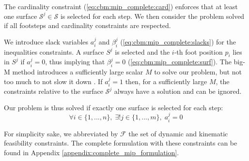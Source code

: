 The cardinality constraint (\ref{eq:cbm:mip_complete:card}) enforces that at least one surface $\mathcal{S}^j \in \mathcal{S}$ is selected for each step.
We then consider the problem solved if all footsteps and cardinality constraints are respected. 

We introduce slack variables $a_i^j$ and $\beta_i^j$ (\ref{eq:cbm:mip_complete:slacks}) for the inequalities constraints. %
A surface $S^j$ is selected and the $i$-th foot position $p_i$ lies in  $S^j$ if $a_i^j = 0$, thus implying that $\beta_i^j = 0$ (\ref{eq:cbm:mip_complete:surf}).
The big-M method introduces a sufficiently large scalar $M$ to solve our problem, but not too much to not slow it down \cite{big_M_danger}.
If $a_i^j = 1$ then, for a sufficiently large $M$, the constraints relative to the surface $\mathcal{S}^j$ always have a solution and can be ignored.

Our problem is thus solved if exactly one surface is selected for each step:
\begin{equation}
    \forall i \in \{1,...,n\},\; \exists! j \in \{1,...,m\},\; a^j_i = 0
\end{equation}

For simplicity sake, we abbreviated by $\mathcal{F}$ the set of dynamic and kinematic feasibility constraints.
The complete formulation with these constraints can be found in Appendix \ref{appendix:complete_mip_formulation}.

